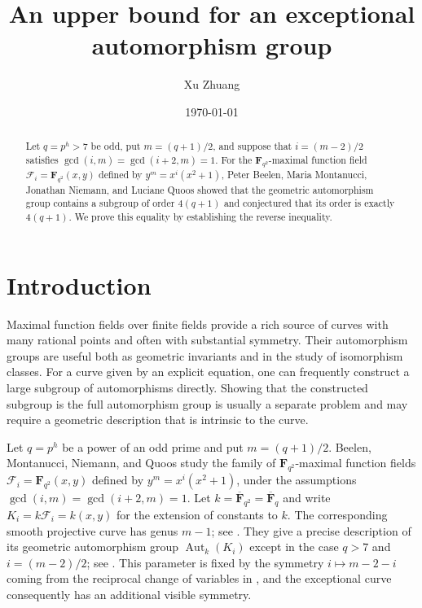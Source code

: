 \documentclass[11pt,reqno]{amsart}
\title
{An upper bound for an exceptional automorphism group}
\author{Xu Zhuang}
\date{\today}
\theoremstyle{remark}
\newcommand{\Aut}{\operatorname{Aut}}
\newcommand{\F}{\mathbf{F}}
\begin{document}
\begin{abstract}
Let $q=p^h>7$ be odd, put $m=(q+1)/2$, and suppose that $i=(m-2)/2$ satisfies $\gcd(i,m)=\gcd(i+2,m)=1$. For the $\mathbf{F}_{q^2}$-maximal function field $\mathcal{F}_i=\mathbf{F}_{q^2}(x,y)$ defined by $y^m=x^i(x^2+1)$, Peter Beelen, Maria Montanucci, Jonathan Niemann, and Luciane Quoos showed that the geometric automorphism group contains a subgroup of order $4(q+1)$ and conjectured that its order is exactly $4(q+1)$. We prove this equality by establishing the reverse inequality.
\end{abstract}

\maketitle

\section{Introduction}

Maximal function fields over finite fields provide a rich source of curves with many rational points and often with substantial symmetry. Their automorphism groups are useful both as geometric invariants and in the study of isomorphism classes. For a curve given by an explicit equation, one can frequently construct a large subgroup of automorphisms directly. Showing that the constructed subgroup is the full automorphism group is usually a separate problem and may require a geometric description that is intrinsic to the curve.

Let $q=p^h$ be a power of an odd prime and put $m=(q+1)/2$. Beelen, Montanucci, Niemann, and Quoos study the family of $\F_{q^2}$-maximal function fields $\mathcal{F}_i=\F_{q^2}(x,y)$ defined by $y^m=x^i(x^2+1)$,
under the assumptions $\gcd(i,m)=\gcd(i+2,m)=1$. Let $k=\overline{\F}_{q^2}=\overline{\F}_q$ and write $K_i=k\mathcal{F}_i=k(x,y)$ for the extension of constants to $k$. The corresponding smooth projective curve has genus $m-1$; see \cite[Section~3]{BeelenMontanucciNiemannQuoos}. They give a precise description of its geometric automorphism group $\Aut_k(K_i)$ except in the case $q>7$ and $i=(m-2)/2$; see \cite[Theorem~4.9]{BeelenMontanucciNiemannQuoos}. This parameter is fixed by the symmetry $i\mapsto m-2-i$ coming from the reciprocal change of variables in \cite[Lemma~3.2]{BeelenMontanucciNiemannQuoos}, and the exceptional curve consequently has an additional visible symmetry.
\end{document}
